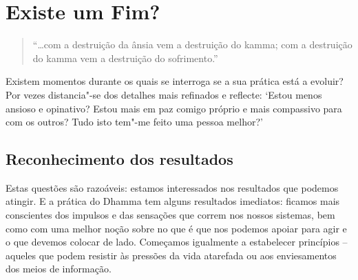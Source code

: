 \chapter{Existe um Fim?}

\begin{quote}
  ``\ldots{}com a destruição da ânsia vem a destruição do kamma; com a
  destruição do kamma vem a destruição do sofrimento.''

\end{quote}

Existem momentos durante os quais se interroga se a sua prática está a evoluir?
Por vezes distancia"-se dos detalhes mais refinados e reflecte: `Estou menos
ansioso e opinativo? Estou mais em paz comigo próprio e mais compassivo para com
os outros? Tudo isto tem"-me feito uma pessoa melhor?'

\section{Reconhecimento dos resultados}

Estas questões são razoáveis: estamos interessados nos resultados que podemos
atingir. E a prática do Dhamma tem alguns resultados imediatos: ficamos mais
conscientes dos impulsos e das sensações que correm nos nossos sistemas, bem
como com uma melhor noção sobre no que é que nos podemos apoiar para agir e o
que devemos colocar de lado. Começamos igualmente a estabelecer princípios --
aqueles que podem resistir às pressões da vida atarefada ou aos enviesamentos
dos meios de informação.

